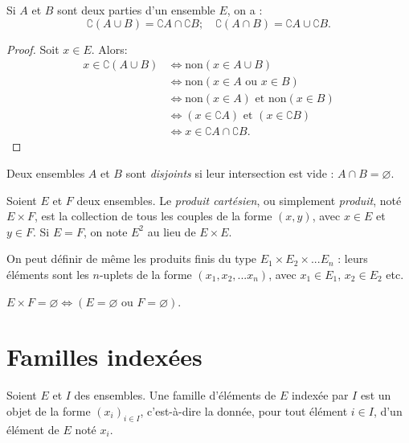 \begin{proposition}
Si $A$ et $B$ sont deux parties d'un ensemble $E$, on a :
\[
\complement(A\cup B) = \complement A \cap \complement B; \quad
\complement(A\cap B) = \complement A \cup \complement B.
\]
\end{proposition}
\begin{proof}
Soit $x\in E$. Alors:
\begin{align*}
x\in \complement(A\cup B) 
&\iff \text{non}(x \in A\cup B)\\
&\iff \text{non}(x \in A \text{ ou } x\in B)\\
&\iff \text{non}(x \in A) \text{ et } \text{non}(x\in B)\\
&\iff \left(x\in\complement A\right) \text{ et } \left(x\in\complement B\right)\\
&\iff x\in \complement A \cap \complement B.
\end{align*}
\end{proof}

\begin{definition}
Deux ensembles $A$ et $B$ sont \emph{disjoints} si leur intersection est vide : $A\cap B = \varnothing$. 
\end{definition}


\begin{definition}
Soient $E$ et $F$ deux ensembles. Le \emph{produit cartésien}, ou simplement \emph{produit}, noté $E\times F$, est la collection de tous les couples  de la forme $(x,y)$, avec $x\in E$ et $y\in F$. Si $E=F$, on note $E^2$ au lieu de $E\times E$. 

On peut définir de même les produits finis du type $E_1\times E_2 \times ... E_n$ : leurs éléments sont les $n$-uplets de la forme $(x_1, x_2, ... x_n)$, avec $x_1\in E_1$, $x_2\in E_2$ etc. 
\end{definition}

\begin{remarque}
$E\times F = \varnothing \iff \left( E=\varnothing\text{ ou }F=\varnothing\right)$.
\end{remarque}

\section{Familles indexées}

\begin{definition}
Soient $E$ et $I$ des ensembles. Une famille d'éléments de $E$  indexée par $I$  est un objet de la forme $(x_i)_{i\in I}$, c'est-à-dire la donnée, pour tout élément $i\in I$, d'un élément de $E$ noté $x_i$.
\end{definition}

